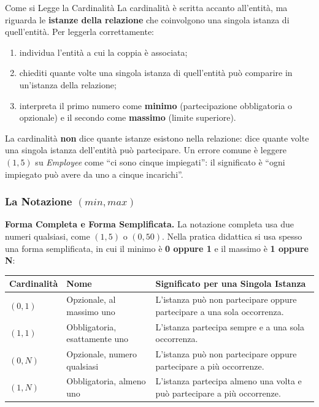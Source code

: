 \documentclass[12pt]{extarticle}
\begin{document}
\begin{cbox}{Come si Legge la Cardinalità}
\noindent La cardinalità è scritta accanto all'entità, ma riguarda le \textbf{istanze della relazione} che coinvolgono una singola istanza di quell'entità. Per leggerla correttamente:
\begin{enumerate}
    \item individua l'entità a cui la coppia è associata;
    \item chiediti quante volte una singola istanza di quell'entità può comparire in un'istanza della relazione;
    \item interpreta il primo numero come \textbf{minimo} (partecipazione obbligatoria o opzionale) e il secondo come \textbf{massimo} (limite superiore).
\end{enumerate}
La cardinalità \textbf{non} dice quante istanze esistono nella relazione: dice quante volte una singola istanza dell'entità può partecipare. Un errore comune è leggere $(1,5)$ su \textit{Employee} come ``ci sono cinque impiegati'': il significato è ``ogni impiegato può avere da uno a cinque incarichi''.
\end{cbox}

\subsubsection{La Notazione $(min,max)$}

\noindent \textbf{Forma Completa e Forma Semplificata.} La notazione completa usa due numeri qualsiasi, come $(1,5)$ o $(0,50)$. Nella pratica didattica si usa spesso una forma semplificata, in cui il minimo è \textbf{0 oppure 1} e il massimo è \textbf{1 oppure N}:

\begin{center}
\small
\begin{tabular}{@{}L{2.4cm}L{4.4cm}L{7.6cm}@{}}
    \toprule
    \textbf{Cardinalità} & \textbf{Nome} & \textbf{Significato per una Singola Istanza} \\
    \midrule
    $(0,1)$ & Opzionale, al massimo uno & L'istanza può non partecipare oppure partecipare a una sola occorrenza. \\
    \addlinespace
    $(1,1)$ & Obbligatoria, esattamente uno & L'istanza partecipa sempre e a una sola occorrenza. \\
    \addlinespace
    $(0,N)$ & Opzionale, numero qualsiasi & L'istanza può non partecipare oppure partecipare a più occorrenze. \\
    \addlinespace
    $(1,N)$ & Obbligatoria, almeno uno & L'istanza partecipa almeno una volta e può partecipare a più occorrenze. \\
    \bottomrule
\end{tabular}
\end{center}
\end{document}

